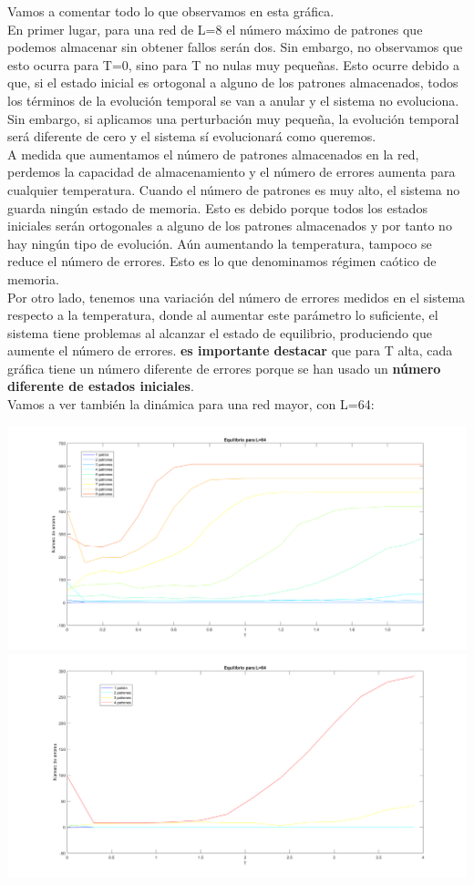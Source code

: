 \documentclass[titlepage,12pt]{article}
\numberwithin{equation}{section}
\begin{document}
Vamos a comentar todo lo que observamos en esta gráfica.\\
En primer lugar, para una red de L=8 el número máximo de patrones que podemos almacenar sin obtener fallos serán dos. Sin embargo, no observamos que esto ocurra para T=0, sino para T no nulas muy pequeñas. Esto ocurre debido a que, si el estado inicial es ortogonal a alguno de los patrones almacenados, todos los términos de la evolución temporal se van a anular y el sistema no evoluciona. Sin embargo, si aplicamos una perturbación muy pequeña, la evolución temporal será diferente de cero y el sistema sí evolucionará como queremos.\\
A medida que aumentamos el número de patrones almacenados en la red, perdemos la capacidad de almacenamiento y el número de errores aumenta para cualquier temperatura. Cuando el número de patrones es muy alto, el sistema no guarda ningún estado de memoria. Esto es debido porque todos los estados iniciales serán ortogonales a alguno de los patrones almacenados y por tanto no hay ningún tipo de evolución. Aún aumentando la temperatura, tampoco se reduce el número de errores. Esto es lo que denominamos régimen caótico de memoria.\\
Por otro lado, tenemos una variación del número de errores medidos en el sistema respecto a la temperatura, donde al aumentar este parámetro lo suficiente, el sistema tiene problemas al alcanzar el estado de equilibrio, produciendo que aumente el número de errores. \textbf{es importante destacar} que para T alta, cada gráfica tiene un número diferente de errores porque se han usado un \textbf{número diferente de estados iniciales}.\\
Vamos a ver también la dinámica para una red mayor, con L=64:\\
\begin{center}
     \includegraphics[scale=0.2]{dinamicaL64.png}
     \includegraphics[scale=0.2]{dinamicaL64Talta.png}
 \end{center}
\end{document}
